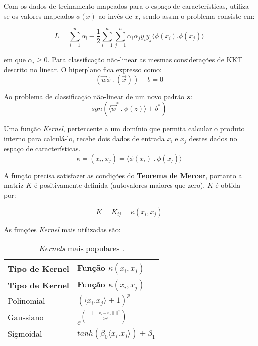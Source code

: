 \documentclass[
  openany]{book}
\begin{document}
Com os dados de treinamento mapeados para o espaço de características, utiliza-se os valores mapeados \(\phi(x)\) ao invés de \(x\), sendo assim o problema consiste em:

\begin{equation} 
L =\displaystyle \sum^n_{i=1}\alpha_i-\frac{1}{2} \displaystyle \sum^n_{i=1}\sum^n_{j=1}\alpha_i\alpha_j y_i y_j \langle \phi(x_i).\phi(x_j)\rangle
\label{eq:svnphi}
\end{equation}

em que \(\alpha_i \geq 0\). Para classificação não-linear as mesmas considerações de KKT descrito no linear. O hiperplano fica expresso como:
\begin{equation}
(\vec{w}\phi \ . \ (\vec{x}))+b=0
\label{eq:hipotimophi}
\end{equation}

Ao problema de classificação não-linear de um novo padrão \textbf{z}:
\begin{equation}
sgn(\langle \vec{w}^* \ . \ \phi(z)\rangle+b^*)
\label{eq:naolinzphi}
\end{equation}

Uma função \emph{Kernel}, pertencente a um domínio que permita calcular o produto interno para calculá-lo, recebe dois dados de entrada \(x_i\) e \(x_j\) destes dados no espaço de características.
\begin{equation}
\kappa=(x_i,x_j)=\langle \phi(x_i) \ . \ \phi(x_j)\rangle
\label{eq:kernel}
\end{equation}

A função precisa satisfazer as condições do \textbf{Teorema de Mercer}, portanto a matriz \(K\) é positivamente definida (autovalores maiores que zero). \(K\) é obtida por:

\begin{equation}
K=K_{ij}=\kappa(x_i,x_j)
\label{eq:mercer}
\end{equation}

As funções \emph{Kernel} mais utilizadas são:

\begin{longtable}[]{@{}ll@{}}
\caption{\label{tab:kernel} \emph{Kernels} mais populares \citep{gonccalves2015maquina}.}\tabularnewline
\toprule
\textbf{Tipo de Kernel} & \textbf{Função \(\kappa(x_i,x_j)\)}\tabularnewline
\midrule
\endfirsthead
\toprule
\textbf{Tipo de Kernel} & \textbf{Função \(\kappa(x_i,x_j)\)}\tabularnewline
\midrule
\endhead
Polinomial & \((\langle x_i.x_j\rangle +1)^p\)\tabularnewline
Gaussiano & \(e^{(-\frac{\|\|x_i-x_j\|\|^2}{2\sigma^2})}\)\tabularnewline
Sigmoidal & \(tanh(\beta_0 \langle x_i.x_j\rangle )+\beta_1\)\tabularnewline
\bottomrule
\end{longtable}
\end{document}
